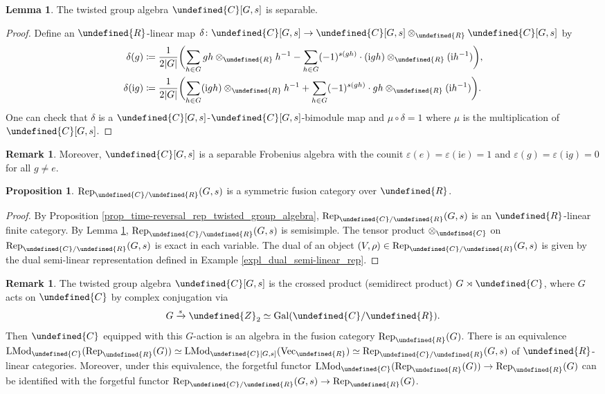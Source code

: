 \documentclass[10pt]{article}
\let\mathbb\undefined
\theoremstyle{definition}
\newtheorem{prop}[thm]{Proposition}
\newtheorem{lem}[thm]{Lemma}
\newtheorem{rem}[thm]{Remark}
\numberwithin{equation}{section}
\numberwithin{thm}{section}
\newcommand{\pf}{\begin{proof}}
\newcommand{\epf}{\end{proof}}
\newcommand{\Cb}{\mathbb{C}}
\newcommand{\Rb}{\mathbb{R}}
\newcommand{\Zb}{\mathbb{Z}}
\DeclareMathOperator{\LMod}{LMod}
\DeclareMathOperator{\Gal}{Gal}
\newcommand{\vect}{\mathrm{Vec}}
\newcommand{\rep}{\mathrm{Rep}}
\begin{document}
\begin{lem} \label{lem_twisted_group_algebra_separable}
The twisted group algebra $\Cb[G,s]$ is separable.
\end{lem}

\pf
Define an $\Rb$-linear map $\delta \colon \Cb[G,s] \to \Cb[G,s] \otimes_\Rb \Cb[G,s]$ by
\begin{align*}
\delta(g) & \coloneqq \frac{1}{2\lvert G \rvert} \biggl(\sum_{h \in G} gh \otimes_\Rb h^{-1} - \sum_{h \in G} (-1)^{s(gh)} \cdot (\mathrm i gh) \otimes_\Rb (\mathrm i h^{-1}) \biggr) , \\
\delta(\mathrm i g) & \coloneqq \frac{1}{2\lvert G \rvert} \biggl(\sum_{h \in G} (\mathrm i gh) \otimes_\Rb h^{-1} + \sum_{h \in G} (-1)^{s(gh)} \cdot gh \otimes_\Rb (\mathrm i h^{-1}) \biggr) .
\end{align*}
One can check that $\delta$ is a $\Cb[G,s]$-$\Cb[G,s]$-bimodule map and $\mu \circ \delta = 1$ where $\mu$ is the multiplication of $\Cb[G,s]$.
\epf

\begin{rem}
Moreover, $\Cb[G,s]$ is a separable Frobenius algebra with the counit $\varepsilon(e) = \varepsilon(\mathrm i e) = 1$ and $\varepsilon(g) = \varepsilon(\mathrm i g) = 0$ for all $g \neq e$.
\end{rem}

\begin{prop}
$\rep_{\Cb/\Rb}(G,s)$ is a symmetric fusion category over $\Rb$.
\end{prop}

\pf
By Proposition \ref{prop_time-reversal_rep_twisted_group_algebra}, $\rep_{\Cb/\Rb}(G,s)$ is an $\Rb$-linear finite category. By Lemma \ref{lem_twisted_group_algebra_separable}, $\rep_{\Cb/\Rb}(G,s)$ is semisimple. The tensor product $\otimes_\Cb$ on $\rep_{\Cb/\Rb}(G,s)$ is exact in each variable. The dual of an object $(V,\rho) \in \rep_{\Cb/\Rb}(G,s)$ is given by the dual semi-linear representation defined in Example \ref{expl_dual_semi-linear_rep}.
\epf

\begin{rem}
The twisted group algebra $\Cb[G,s]$ is the crossed product (semidirect product) $G \rtimes \Cb$, where $G$ acts on $\Cb$ by complex conjugation via
\[
G \xrightarrow{s} \Zb_2 \simeq \Gal(\Cb/\Rb) .
\]
Then $\Cb$ equipped with this $G$-action is an algebra in the fusion category $\rep_\Rb(G)$. There is an equivalence $\LMod_{\Cb}(\rep_\Rb(G)) \simeq \LMod_{\Cb[G,s]}(\vect_\Rb) \simeq \rep_{\Cb/\Rb}(G,s)$ of $\Rb$-linear categories. Moreover, under this equivalence, the forgetful functor $\LMod_\Cb(\rep_\Rb(G)) \to \rep_\Rb(G)$ can be identified with the forgetful functor $\rep_{\Cb/\Rb}(G,s) \to \rep_\Rb(G)$.
\end{rem}
\end{document}
